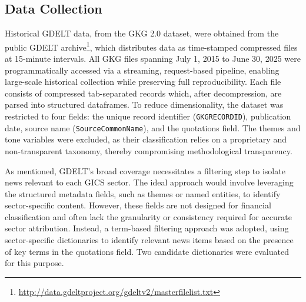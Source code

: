 \subsection{Data Collection}
\label{subsec:gdelt_data}

Historical GDELT data, from the GKG 2.0 dataset, were obtained from the public GDELT archive\footnote{\url{http://data.gdeltproject.org/gdeltv2/masterfilelist.txt}}, which distributes data as time-stamped compressed files at 15-minute intervals. All GKG files spanning July 1, 2015 to June 30, 2025 were programmatically accessed via a streaming, request-based pipeline, enabling large-scale historical collection while preserving full reproducibility. Each file consists of compressed tab-separated records which, after decompression, are parsed into structured dataframes. To reduce dimensionality, the dataset was restricted to four fields: the unique record identifier (\texttt{GKGRECORDID}), publication date, source name (\texttt{SourceCommonName}), and the quotations field. The themes and tone variables were excluded, as their classification relies on a proprietary and non-transparent taxonomy, thereby compromising methodological transparency.

As mentioned, GDELT's broad coverage necessitates a filtering step to isolate news relevant to each GICS sector. The ideal approach would involve leveraging the structured metadata fields, such as themes or named entities, to identify sector-specific content. However, these fields are not designed for financial classification and often lack the granularity or consistency required for accurate sector attribution. Instead, a term-based filtering approach was adopted, using sector-specific dictionaries to identify relevant news items based on the presence of key terms in the quotations field. Two candidate dictionaries were evaluated for this purpose.

